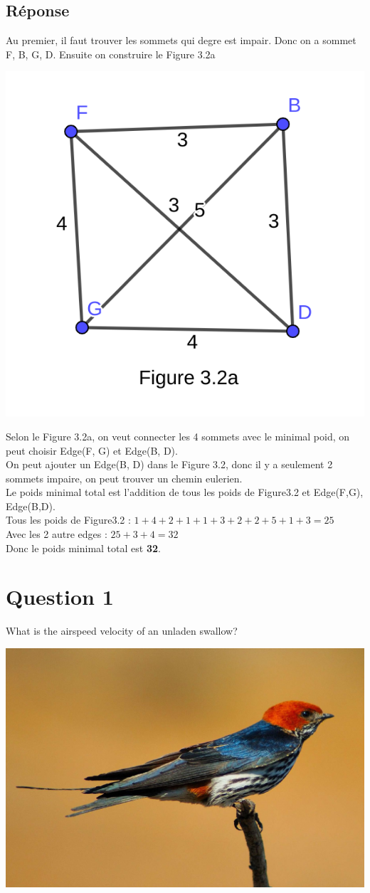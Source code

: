\documentclass[12pt]{fphw}
\begin{document}
\subsection*{Réponse}Au premier, il faut trouver les sommets qui degre est impair. Donc on a sommet F, B, G, D. Ensuite on construire le Figure 3.2a\\

\begin{center}
	\includegraphics[width=0.5\columnwidth]{Figure3.2a.png} %
\end{center}

Selon le Figure 3.2a, on veut connecter les 4 sommets avec le minimal poid, on peut choisir Edge(F, G) et Edge(B, D).\\

On peut ajouter un Edge(B, D) dans le Figure 3.2, donc il y a seulement 2 sommets impaire, on peut trouver un chemin eulerien.\\

Le poids minimal total est l'addition de tous les poids de Figure3.2 et Edge(F,G), Edge(B,D).\\

Tous les poids de Figure3.2 : \(1+4+2+1+1+3+2+2+5+1+3 = 25\)\\
Avec les 2 autre edges : \(25 + 3 + 4 = 32\)\\

Donc le poids minimal total est \textbf{32}.

\newpage

\section*{Question 1}

\begin{problem}
	What is the airspeed velocity of an unladen swallow?
\end{problem}
\begin{center}
	\includegraphics[width=0.5\columnwidth]{swallow.jpg} %
\end{center}
\end{document}
